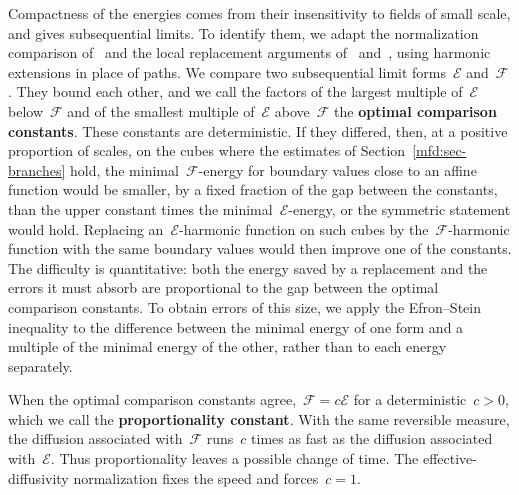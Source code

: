 \documentclass[11pt]{amsart}
\begin{document}
Compactness of the energies comes from their insensitivity to fields of small scale, and gives subsequential limits. To identify them, we adapt the normalization comparison of~\citet[Section~3.4]{DGComparison} and the local replacement arguments of~\citet[Section~6]{GM} and~\citet[Section~4.5]{DGUniqueness}, using harmonic extensions in place of paths. We compare two subsequential limit forms~$\mathscr E$ and~$\mathscr F$. They bound each other, and we call the factors of the largest multiple of~$\mathscr E$ below~$\mathscr F$ and of the smallest multiple of~$\mathscr E$ above~$\mathscr F$ the \textbf{optimal comparison constants}. These constants are deterministic. If they differed, then, at a positive proportion of scales, on the cubes where the estimates of Section~\ref{mfd:sec-branches} hold, the minimal~$\mathscr F$-energy for boundary values close to an affine function would be smaller, by a fixed fraction of the gap between the constants, than the upper constant times the minimal~$\mathscr E$-energy, or the symmetric statement would hold. Replacing an~$\mathscr E$-harmonic function on such cubes by the~$\mathscr F$-harmonic function with the same boundary values would then improve one of the constants. The difficulty is quantitative: both the energy saved by a replacement and the errors it must absorb are proportional to the gap between the optimal comparison constants. To obtain errors of this size, we apply the Efron--Stein inequality to the difference between the minimal energy of one form and a multiple of the minimal energy of the other, rather than to each energy separately.

When the optimal comparison constants agree,~$\mathscr F=c\mathscr E$ for a deterministic~$c>0$, which we call the \textbf{proportionality constant}. With the same reversible measure, the diffusion associated with~$\mathscr F$ runs~$c$ times as fast as the diffusion associated with~$\mathscr E$. Thus proportionality leaves a possible change of time. The effective-diffusivity normalization fixes the speed and forces~$c=1$.

\smallskip
\end{document}
